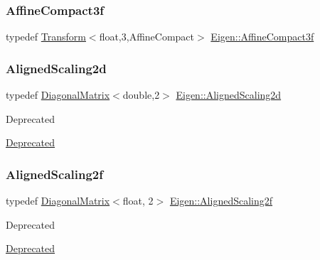 \subsubsection{\texorpdfstring{AffineCompact3f}{AffineCompact3f}}
{\footnotesize\ttfamily typedef \mbox{\hyperlink{class_eigen_1_1_transform}{Transform}}$<$float,3,Affine\+Compact$>$ \mbox{\hyperlink{group___geometry___module_ga372437883db5fe0332141ae30d4f501a}{Eigen\+::\+Affine\+Compact3f}}}

\mbox{\label{group___geometry___module_gaf8975289b8134a5021e806029516e82c}} 
\subsubsection{\texorpdfstring{AlignedScaling2d}{AlignedScaling2d}}
{\footnotesize\ttfamily typedef \mbox{\hyperlink{class_eigen_1_1_diagonal_matrix}{Diagonal\+Matrix}}$<$double,2$>$ \mbox{\hyperlink{group___geometry___module_gaf8975289b8134a5021e806029516e82c}{Eigen\+::\+Aligned\+Scaling2d}}}

\begin{DoxyRefDesc}{Deprecated}
\item[\mbox{\hyperlink{deprecated__deprecated000032}{Deprecated}}]\end{DoxyRefDesc}
\mbox{\label{group___geometry___module_gaf2440178a1f5f6abef6ee0231bc49184}} 
\subsubsection{\texorpdfstring{AlignedScaling2f}{AlignedScaling2f}}
{\footnotesize\ttfamily typedef \mbox{\hyperlink{class_eigen_1_1_diagonal_matrix}{Diagonal\+Matrix}}$<$float, 2$>$ \mbox{\hyperlink{group___geometry___module_gaf2440178a1f5f6abef6ee0231bc49184}{Eigen\+::\+Aligned\+Scaling2f}}}

\begin{DoxyRefDesc}{Deprecated}
\item[\mbox{\hyperlink{deprecated__deprecated000031}{Deprecated}}]\end{DoxyRefDesc}
\mbox{\label{group___geometry___module_ga0aff001d5740f13797c9acd4e3276673}} 
